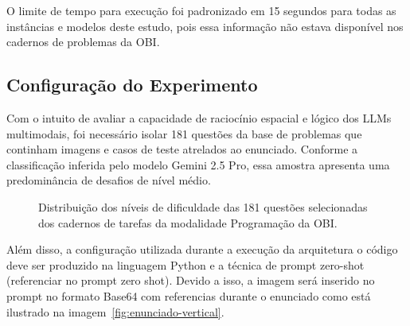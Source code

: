\documentclass[sigconf,anonymous]{acmart} %
\begin{document}
O limite de tempo para execução foi padronizado em 15 segundos para todas as instâncias e modelos deste estudo, pois essa informação não estava disponível nos cadernos de problemas da OBI.

\subsection{Configuração do Experimento}

Com o intuito de avaliar a capacidade de raciocínio espacial e lógico dos LLMs multimodais, foi necessário isolar 181 questões da base de problemas que continham imagens e casos de teste atrelados ao enunciado. Conforme a classificação inferida pelo modelo Gemini 2.5 Pro, essa amostra apresenta uma predominância de desafios de nível médio.

\begin{figure}[H]
  \centering
\caption{Distribuição dos níveis de dificuldade das 181 questões selecionadas dos cadernos de tarefas da modalidade Programação da OBI.}
\end{figure}

Além disso, a configuração utilizada durante a execução da arquitetura o código deve ser produzido na linguagem Python e a técnica de prompt zero-shot (referenciar no prompt zero shot). Devido a isso, a imagem será inserido no prompt no formato Base64 com referencias durante o enunciado como está ilustrado na imagem~\ref{fig:enunciado-vertical}. 
\end{document}
